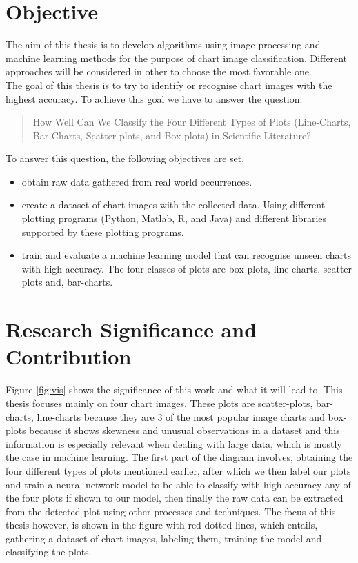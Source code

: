 \documentclass[12pt, a4paper,oneside]{report}
\begin{document}
\section{Objective}
The aim of this thesis is to develop algorithms using image processing and machine learning methods for the purpose of chart image classification. Different approaches will be considered in other to choose the most favorable one.\\
The goal of this thesis is to try to identify or recognise chart images with the highest accuracy. To achieve this goal we have to answer the question: \begin{quote} How Well Can We Classify the Four Different Types of Plots (Line-Charts, Bar-Charts, Scatter-plots, and Box-plots) in Scientific Literature? \end{quote} 
To answer this question, the following objectives are set.

\begin{itemize}\itemsep3pt
	\item obtain raw data gathered from real world occurrences.
	\item create a dataset of chart images with the collected data. Using  different plotting programs (Python, Matlab, R, and Java) and different libraries supported by these plotting programs.
	\item train and evaluate a machine learning model that can recognise unseen charts with high accuracy. The four classes of plots are box plots, line charts, scatter plots and, bar-charts.
\end{itemize}

\section{Research Significance and Contribution}
Figure \ref{fig:vis} shows the significance of this work and what it will lead to. This thesis focuses mainly on four chart images. These plots are scatter-plots, bar-charts, line-charts because they are 3 of the most popular image charts and box-plots because it shows skewness and unusual observations in a dataset and this information is especially relevant when dealing with large data, which is mostly the case in machine learning. The first part of the diagram involves, obtaining  the four different types of plots mentioned earlier, after which we then label our plots and train a neural network model to be able to classify with high accuracy any of the four plots if shown to our model, then finally the raw data can be extracted from the detected plot using other processes and techniques. The focus of this thesis however, is shown in the figure with red dotted lines, which entails, gathering a dataset of chart images, labeling them, training the model and classifying the plots. \\
\end{document}
